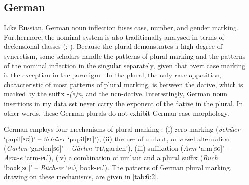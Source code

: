 \subsection{German}\label{german}

Like Russian, German noun inflection fuses case, number, and gender marking. Furthermore, the nominal system is also traditionally analysed in terms of declensional classes (\citealt[158]{eisenberg06}; ). Because the plural demonstrates a high degree of syncretism, some scholars handle the patterns of plural marking and the patterns of the nominal inflection in the singular separately, given that overt case marking is the exception in the paradigm \citep{flaemig, helbig-buscha,hentschel-weydt}. In the plural, the only case opposition, characteristic of most patterns of plural marking, is between the dative, which is marked by the suffix -\textit{(e)n}, and the non-dative. Interestingly, German noun insertions in my data set never carry the exponent of the dative in the plural. In other words, these German plurals do not exhibit German case morphology.

German employs four mechanisms of plural marking \citep[480]{flaemig}: (i) zero marking (\textit{Schüler} `pupil[\textsc{sg}])' -- \textit{Schüler} `pupil[\textsc{pl}]'), (ii) the use of umlaut, or vowel alternation (\textit{Garten} `garden[\textsc{sg}]' -- \textit{Gärten} `\textsc{pl}\textbackslash{}garden'), (iii) suffixation (\textit{Arm} `arm[\textsc{sg}]' -- \textit{Arm-e} `arm-\textsc{pl}'), (iv) a combination of umlaut and a plural suffix (\textit{Buch} `book[\textsc{sg}]' -- \textit{Büch-er} `\textsc{pl}\textbackslash{} book-\textsc{pl}'). The patterns of German plural marking, drawing on these mechanisms, are given in \ref{tab:6:2}.

